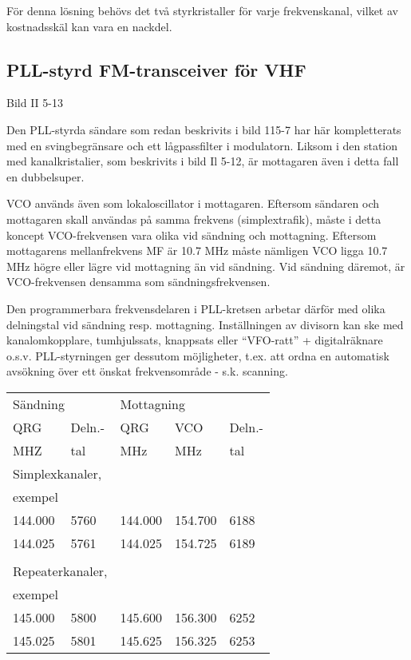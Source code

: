 För denna lösning behövs det två styrkristaller för varje
frekvenskanal, vilket av kostnadsskäl kan vara en nackdel.

\subsection{PLL-styrd FM-transceiver för VHF}

Bild II 5-13

Den PLL-styrda sändare som redan beskrivits i bild 115-7 har här
kompletterats med en svingbegränsare och ett lågpassfilter i
modulatorn. Liksom i den station med kanalkristalier, som beskrivits i
bild Il 5-12, är mottagaren även i detta fall en dubbelsuper.

VCO används även som lokaloscillator i mottagaren. Eftersom sändaren
och mottagaren skall användas på samma frekvens (simplextrafik), måste
i detta koncept VCO-frekvensen vara olika vid sändning och
mottagning. Eftersom mottagarens mellanfrekvens MF är 10.7 MHz måste
nämligen VCO ligga 10.7 MHz högre eller lägre vid mottagning än vid
sändning. Vid sändning däremot, är VCO-frekvensen densamma som
sändningsfrekvensen.

Den programmerbara frekvensdelaren i PLL-kretsen arbetar därför med
olika delningstal vid sändning resp. mottagning. Inställningen av
divisorn kan ske med kanalomkopplare, tumhjulssats, knappsats eller
``VFO-ratt'' + digitalräknare o.s.v. PLL-styrningen ger dessutom
möjligheter, t.ex. att ordna en automatisk avsökning över ett önskat
frekvensområde - s.k. scanning.

\begin{table}[h]
  \begin{tabular}{ll|lll}
    \multicolumn{2}{l|}{Sändning} &
    \multicolumn{3}{l}{Mottagning} \\
    QRG & Deln.- & QRG & VCO & Deln.- \\
    MHZ & tal    & MHz & MHz & tal \\
    \hline
    \multicolumn{2}{l|}{Simplexkanaler,} & & & \\
    \multicolumn{2}{l|}{exempel} & & & \\
    144.000 & 5760 & 144.000 & 154.700 & 6188 \\
    144.025 & 5761 & 144.025 & 154.725 & 6189 \\
    & & & & \\
    \multicolumn{2}{l|}{Repeaterkanaler,} & & & \\
    \multicolumn{2}{l|}{exempel} & & & \\
    145.000 & 5800 & 145.600 & 156.300 & 6252 \\
    145.025 & 5801 & 145.625 & 156.325 & 6253 \\
  \end{tabular}
\end{table}

